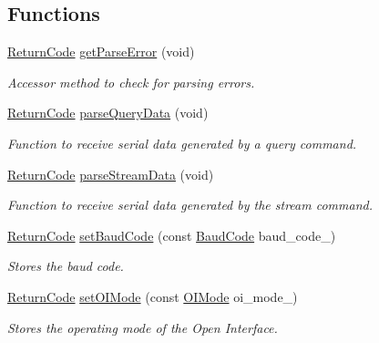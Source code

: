 \subsection*{Functions}
\begin{DoxyCompactItemize}
\item 
\hyperlink{namespaceroomba_aff53babe0af88b1ea8b066fd18b8f23f}{Return\+Code} \hyperlink{namespaceroomba_1_1state_a85d19eb1f7d2871cf53d0413159b7a2b}{get\+Parse\+Error} (void)
\begin{DoxyCompactList}\small\item\em Accessor method to check for parsing errors. \end{DoxyCompactList}\item 
\hyperlink{namespaceroomba_aff53babe0af88b1ea8b066fd18b8f23f}{Return\+Code} \hyperlink{namespaceroomba_1_1state_a295e713733b669bf36f35aa1304d6af2}{parse\+Query\+Data} (void)
\begin{DoxyCompactList}\small\item\em Function to receive serial data generated by a query command. \end{DoxyCompactList}\item 
\hyperlink{namespaceroomba_aff53babe0af88b1ea8b066fd18b8f23f}{Return\+Code} \hyperlink{namespaceroomba_1_1state_ae7ffae2671309085bfc9e7eacd9cecbe}{parse\+Stream\+Data} (void)
\begin{DoxyCompactList}\small\item\em Function to receive serial data generated by the stream command. \end{DoxyCompactList}\item 
\hyperlink{namespaceroomba_aff53babe0af88b1ea8b066fd18b8f23f}{Return\+Code} \hyperlink{namespaceroomba_1_1state_aea76767beb90c172924534fde3de51f8}{set\+Baud\+Code} (const \hyperlink{namespaceroomba_a303ba447b12fc77bc24977a1a7ec6d6c}{Baud\+Code} baud\+\_\+code\+\_\+)
\begin{DoxyCompactList}\small\item\em Stores the baud code. \end{DoxyCompactList}\item 
\hyperlink{namespaceroomba_aff53babe0af88b1ea8b066fd18b8f23f}{Return\+Code} \hyperlink{namespaceroomba_1_1state_a9c0d2581bdb082ca4603ac8c8cb290a4}{set\+O\+I\+Mode} (const \hyperlink{namespaceroomba_ab6a52ccd26d50ce82376d04a27c6e76a}{O\+I\+Mode} oi\+\_\+mode\+\_\+)
\begin{DoxyCompactList}\small\item\em Stores the operating mode of the Open Interface. \end{DoxyCompactList}\item 

\end{DoxyCompactItemize}
